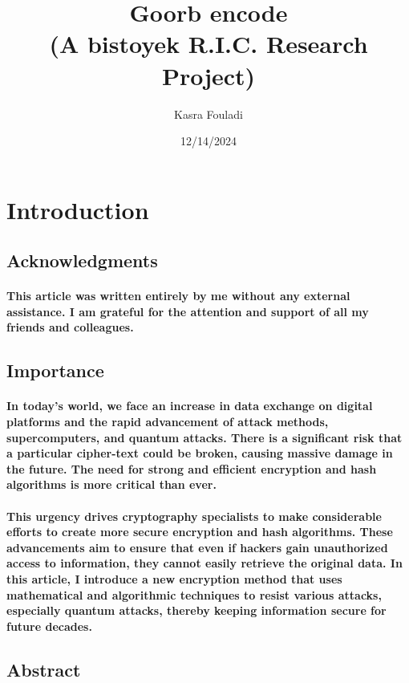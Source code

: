 \documentclass[oneside]{book}
\newcommand{\myparagraph}[1]{\paragraph{\textnormal{#1}}}
\begin{document}
\title{Goorb encode\\(A bistoyek R.I.C. Research Project)}
\author{Kasra Fouladi}
\date{12/14/2024}

\maketitle

\frontmatter
\tableofcontents
\mainmatter

\small

\section{Introduction}

\subsection{Acknowledgments}

\myparagraph{
This article was written entirely by me without any external assistance. I am grateful for the attention and support of all my friends and colleagues.
}

\subsection{Importance}

\myparagraph{
In today’s world, we face an increase in data exchange on digital platforms and the rapid advancement of attack methods, supercomputers, and quantum attacks. There is a significant risk that a particular cipher-text could be broken, causing massive damage in the future. The need for strong and efficient encryption and hash algorithms is more critical than ever.
}

\myparagraph{
This urgency drives cryptography specialists to make considerable efforts to create more secure encryption and hash algorithms. These advancements aim to ensure that even if hackers gain unauthorized access to information, they cannot easily retrieve the original data. In this article, I introduce a new encryption method that uses mathematical and algorithmic techniques to resist various attacks, especially quantum attacks, thereby keeping information secure for future decades.
}

\subsection{Abstract}
\end{document}
